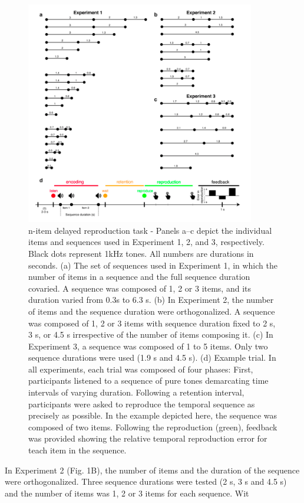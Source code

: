 \begin{figure}[ht]
    \centering
    \includegraphics[width=10cm]{images_report/n-item delayed reproduction task.png}
    \caption[n-item delayed reproduction task]%
    {n-item delayed reproduction task - Panels a–c depict the individual items and sequences used in Experiment 1, 2, and 3, respectively. Black dots represent 1kHz tones. All numbers are durations in seconds. (a) The set of sequences used in Experiment 1, in which the number of items in a sequence and the full sequence duration covaried. A sequence was composed of 1, 2 or 3 items, and its duration varied from 0.3s to 6.3 s. (b) In Experiment 2, the number of items and the sequence duration were orthogonalized. A sequence was composed of 1, 2 or 3 items with sequence duration fixed to 2 s, 3 s, or 4.5 s irrespective of the number of items composing it. (c) In Experiment 3, a sequence was composed of 1 to 5 items. Only two sequence durations were used (1.9 s and 4.5 s). (d) Example trial. In all experiments, each trial was composed of four phases: First, participants listened to a sequence of pure tones demarcating time intervals of varying duration. Following a retention interval, participants were asked to reproduce the temporal sequence as precisely as possible. In the example depicted here, the sequence was composed of two items. Following the reproduction (green), feedback was provided showing the relative temporal reproduction error for teach item in the sequence.}

    \label{paradigm}
\end{figure}

In Experiment 2 (Fig. 1B), the number of items and the duration of the sequence were orthogonalized. Three sequence durations were tested (2 s, 3 s and 4.5 s) and the number of items was 1, 2 or 3 items for each sequence. Wit


